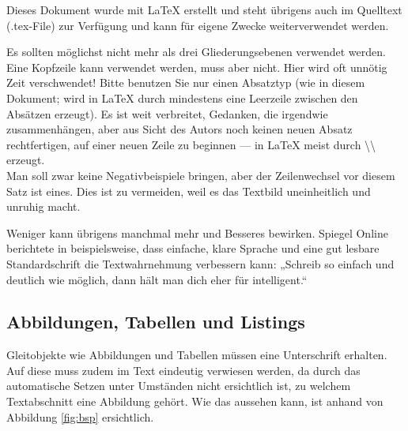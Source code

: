 \documentclass[12pt]{scrartcl}
\begin{document}
Dieses Dokument wurde mit LaTeX erstellt und steht übrigens auch im Quelltext (.tex-File) zur Verfügung und kann für eigene Zwecke weiterverwendet werden.

Es sollten möglichst nicht mehr als drei Gliederungsebenen verwendet werden.
%
Eine Kopfzeile kann verwendet werden, muss aber nicht. Hier wird oft unnötig Zeit verschwendet!
%
Bitte benutzen Sie nur einen Absatztyp (wie in diesem Dokument; wird in LaTeX durch mindestens eine Leerzeile zwischen den Absätzen erzeugt). Es ist weit verbreitet, Gedanken, die irgendwie zusammenhängen, aber aus Sicht des Autors noch keinen neuen Absatz rechtfertigen, auf einer neuen Zeile zu beginnen --- in LaTeX meist durch 
{\textbackslash\textbackslash} 
erzeugt.\\
Man soll zwar keine Negativbeispiele bringen, aber der Zeilenwechsel vor diesem Satz ist eines. Dies ist zu vermeiden, weil es das Textbild uneinheitlich und unruhig macht.

Weniger kann übrigens manchmal mehr und Besseres bewirken. Spiegel Online berichtete in \cite{textwahrnehmung} beispielsweise, dass einfache, klare Sprache und eine gut lesbare Standardschrift die Textwahrnehmung verbessern kann: „Schreib so einfach und deutlich wie möglich, dann hält man dich eher für intelligent.“  

\subsection{Abbildungen, Tabellen und Listings}

Gleitobjekte wie Abbildungen und Tabellen müssen eine Unterschrift erhalten. Auf diese muss zudem im Text eindeutig verwiesen werden, da durch das automatische Setzen unter Umständen nicht ersichtlich ist, zu welchem Textabschnitt eine Abbildung gehört. Wie das aussehen kann, ist anhand von Abbildung \ref{fig:bsp} ersichtlich.
\end{document}

